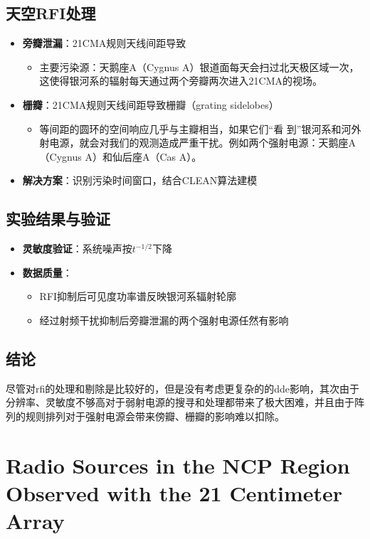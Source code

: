 \documentclass{article}
\begin{document}
\subsection{天空RFI处理}
\begin{itemize}
    \item \textbf{旁瓣泄漏}：21CMA规则天线间距导致
    \begin{itemize}
        \item 主要污染源：天鹅座A（Cygnus A）银道面每天会扫过北天极区域一次，这使得银河系的辐射每天通过两个旁瓣两次进入21CMA的视场。
    \end{itemize}
    \item \textbf{栅瓣}：21CMA规则天线间距导致栅瓣（grating sidelobes）
        \begin{itemize}
            \item 等间距的圆环的空间响应几乎与主瓣相当，如果它们“看
到”银河系和河外射电源，就会对我们的观测造成严重干扰。例如两个强射电源：天鹅座A（Cygnus A）和仙后座A（Cas A）。
            \end{itemize}
    \item \textbf{解决方案}：识别污染时间窗口，结合CLEAN算法建模
\end{itemize}


\subsection{实验结果与验证}
\begin{itemize}
    \item \textbf{灵敏度验证}：系统噪声按$t^{-1/2}$下降
    \item \textbf{数据质量}：
    \begin{itemize}
        \item RFI抑制后可见度功率谱反映银河系辐射轮廓
        \item 经过射频干扰抑制后旁瓣泄漏的两个强射电源任然有影响
    \end{itemize}
\end{itemize}

\subsection{结论}
尽管对rfi的处理和剔除是比较好的，但是没有考虑更复杂的的dde影响，其次由于分辨率、灵敏度不够高对于弱射电源的搜寻和处理都带来了极大困难，并且由于阵列的规则排列对于强射电源会带来傍瓣、栅瓣的影响难以扣除。


\section{Radio Sources in the NCP Region Observed with the 21 Centimeter Array}
\end{document}
